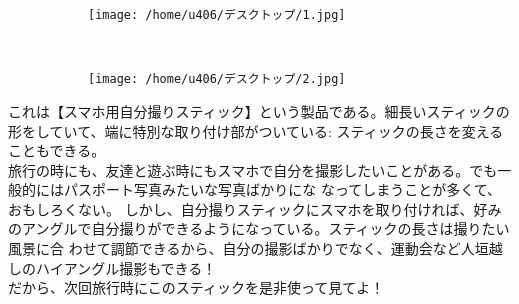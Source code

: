 \documentclass[10pt]{book}
\begin{document}
\begin{figure}
        \centering
        \begin{subfigure}[b]{0.3\textwidth}
                \texttt{[image: /home/u406/デスクトップ/1.jpg]}
        \end{subfigure}%
        ~ %
        \begin{subfigure}[b]{0.075\textwidth}
                \texttt{[image: /home/u406/デスクトップ/2.jpg]}
        \end{subfigure}
\end{figure}
これは【スマホ用自分撮りスティック】という製品である。細長いスティックの形をしていて、端に特別な取り付け部がついている:
スティックの長さを変えることもできる。\\

旅行の時にも、友達と遊ぶ時にもスマホで自分を撮影したいことがある。でも一般的にはパスポート写真みたいな写真ばかりにな
なってしまうことが多くて、おもしろくない。
しかし、自分撮りスティックにスマホを取り付ければ、好みのアングルで自分撮りができるようになっている。スティックの長さは撮りたい風景に合
わせて調節できるから、自分の撮影ばかりでなく、運動会など人垣越しのハイアングル撮影もできる！\\

だから、次回旅行時にこのスティックを是非使って見てよ！
\end{document}
